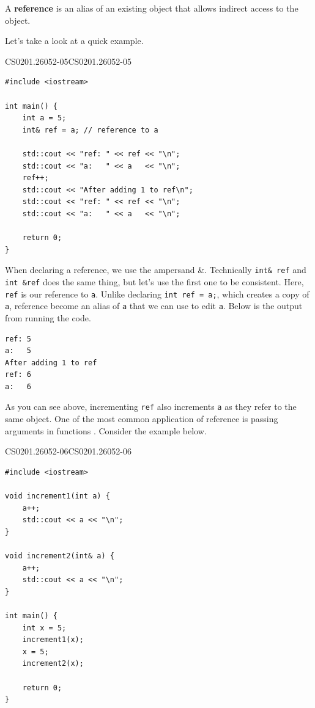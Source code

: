\documentclass[../../main.tex]{subfiles}
\begin{document}
\begin{definition}{}{}
A \textbf{reference} is an alias of an existing object that allows
indirect access to the object.
\end{definition}

Let's take a look at a quick example.

\begin{cppbox}{CS0201.26052-05}{CS0201.26052-05}
\begin{lstlisting}[style=cppstyle]
#include <iostream>

int main() {
    int a = 5;
    int& ref = a; // reference to a

    std::cout << "ref: " << ref << "\n";
    std::cout << "a:   " << a   << "\n";
    ref++;
    std::cout << "After adding 1 to ref\n";
    std::cout << "ref: " << ref << "\n";
    std::cout << "a:   " << a   << "\n";

    return 0;
}
\end{lstlisting}
\end{cppbox}

When declaring a reference, we use the ampersand \&. Technically
\verb|int& ref| and \verb|int &ref| does the same thing, but let's
use the first one to be consistent. Here, \verb|ref| is our
reference to \verb|a|. Unlike declaring \verb|int ref = a;|, which
creates a copy of \verb|a|, reference become an alias of \verb|a|
that we can use to edit \verb|a|. Below is the output from running
the code.

\begin{outputbox}
\begin{lstlisting}[style=basic]
ref: 5
a:   5
After adding 1 to ref
ref: 6
a:   6
\end{lstlisting}
\end{outputbox}

As you can see above, incrementing \verb|ref| also increments \verb|a|
as they refer to the same object. One of the most common application
of reference is passing arguments in functions \cite{CS02-5}.
Consider the example below.

\begin{cppbox}{CS0201.26052-06}{CS0201.26052-06}
\begin{lstlisting}[style=cppstyle]
#include <iostream>

void increment1(int a) {
    a++;
    std::cout << a << "\n";
}

void increment2(int& a) {
    a++;
    std::cout << a << "\n";
}

int main() {
    int x = 5;
    increment1(x);
    x = 5;
    increment2(x);

    return 0;
}
\end{lstlisting}
\end{cppbox}
\end{document}

